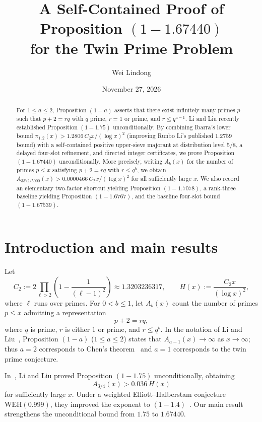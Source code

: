 \documentclass[11pt,reqno]{amsart}
\title[On Proposition $(1-1.67440)$ for the Twin Prime Problem]{A Self-Contained Proof of Proposition $(1-1.67440)$\\ for the Twin Prime Problem}
\author{Wei Lindong}
\date{November 27, 2026}
\theoremstyle{remark}
\numberwithin{equation}{section}
\begin{document}
\begin{abstract}
For $1 \le a \le 2$, Proposition $(1-a)$ asserts that there exist infinitely many primes $p$ such that $p+2 = rq$ with $q$ prime, $r=1$ or prime, and $r \le q^{a-1}$. Li and Liu recently established Proposition $(1-1.75)$ unconditionally. By combining Ibarra's lower bound $\pi_{1,2}(x) > 1.2806\,C_2 x/(\log x)^2$ (improving Runbo Li's published $1.2759$ bound) with a self-contained positive upper-sieve majorant at distribution level $5/8$, a delayed four-slot refinement, and directed integer certificates, we prove Proposition $(1-1.67440)$ unconditionally. More precisely, writing $A_b(x)$ for the number of primes $p \le x$ satisfying $p+2 = rq$ with $r \le q^b$, we obtain $A_{3372/5000}(x) > 0.0000466\,C_2 x/(\log x)^2$ for all sufficiently large $x$. We also record an elementary two-factor shortcut yielding Proposition $(1-1.7078)$, a rank-three baseline yielding Proposition $(1-1.6767)$, and the baseline four-slot bound $(1-1.67539)$.
\end{abstract}

\maketitle

\section{Introduction and main results}\label{sec:intro}

Let
\[
C_2 := 2\prod_{\ell > 2}\left(1 - \frac{1}{(\ell-1)^2}\right) \approx 1.3203236317,
\qquad
H(x) := \frac{C_2 x}{(\log x)^2},
\]
where $\ell$ runs over primes. For $0 < b \le 1$, let $A_b(x)$ count the number of primes $p \le x$ admitting a representation
\[
p + 2 = rq,
\]
where $q$ is prime, $r$ is either $1$ or prime, and $r \le q^b$. In the notation of Li and Liu~\cite{LiLiu2026}, Proposition $(1-a)$ ($1 \le a \le 2$) states that $A_{a-1}(x) \to \infty$ as $x \to \infty$; thus $a=2$ corresponds to Chen's theorem~\cite{Chen1973} and $a=1$ corresponds to the twin prime conjecture.

In~\cite[Theorem~1.2]{LiLiu2026}, Li and Liu proved Proposition $(1-1.75)$ unconditionally, obtaining
\[
A_{3/4}(x) > 0.036\,H(x)
\]
for sufficiently large $x$. Under a weighted Elliott--Halberstam conjecture $\mathrm{WEH}(0.999)$, they improved the exponent to $(1-1.4)$~\cite[Theorem~1.4]{LiLiu2026}. Our main result strengthens the unconditional bound from $1.75$ to $1.67440$.
\end{document}
